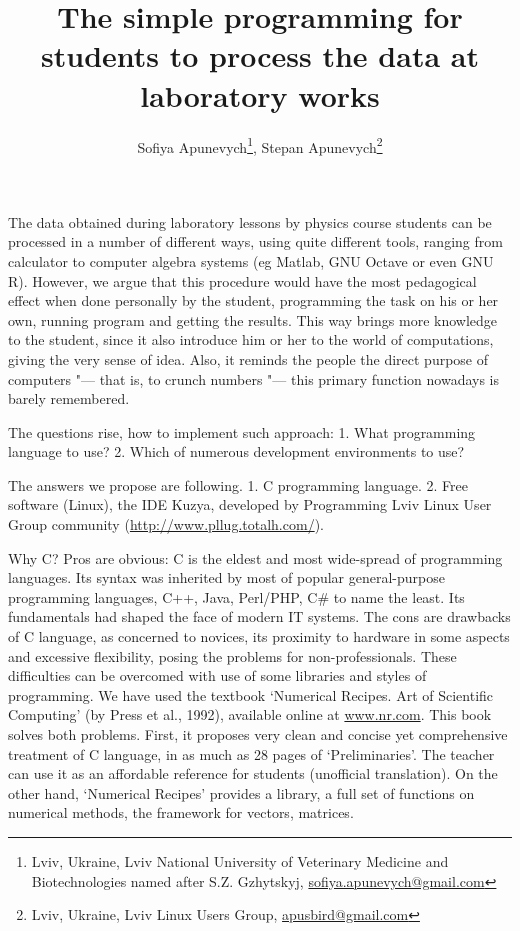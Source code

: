 \documentclass[10pt, a5paper]{article}
\begin{document}
\title{The simple programming for students to process the data at laboratory works}
\author{Sofiya Apunevych\footnote{Lviv, Ukraine, Lviv National University of Veterinary Medicine and Biotechnologies named after S.Z. Gzhytskyj, \url{sofiya.apunevych@gmail.com}}, Stepan Apunevych\footnote{Lviv, Ukraine, Lviv Linux Users Group, \url{apusbird@gmail.com}}}
\date{}
\maketitle

The data obtained during laboratory lessons by physics course students can be processed in a number of different ways, using quite different tools, ranging from calculator to computer algebra systems (eg Matlab, GNU Octave or even GNU R). However, we argue that this procedure would have the most pedagogical effect when done \linebreak personally by the student, programming the task on his or her own, running program and getting the results. This way brings more knowledge to the student, since it also introduce him or her to the world of computations, giving the very sense of idea. Also, it reminds the people the direct purpose of computers "--- that is, to crunch numbers "--- this primary function nowadays is barely remembered.

The questions rise, how to implement such approach: 1. What \linebreak programming language to use? 2. Which of numerous development environments to use?

The answers we propose are following. 1. C programming language. 2. Free software (Linux), the IDE Kuzya, developed by Programming Lviv Linux User Group community (\url{http://www.pllug.totalh.com/}). 

Why C? Pros are obvious: C is the eldest and most wide-spread of programming languages. Its syntax was inherited by most of popular general-purpose programming languages, C++, Java, Perl/PHP, C\#  to name the least. Its fundamentals had shaped the face of modern IT systems. The cons are drawbacks of C language, as concerned to novices, its proximity to hardware in some aspects and excessive \linebreak  flexibility, posing the problems for non-professionals. These difficulties can be overcomed with use of some libraries and styles of programming. We have used the textbook `Numerical Recipes. Art of Scientific Computing' (by Press et al., 1992), available online at \url{www.nr.com}. This book solves both problems. First, it proposes very clean and  concise yet comprehensive treatment of C language, in as much as 28 pages of `Preliminaries'. The teacher can use it as an affordable reference for students (unofficial translation). On the other hand, `Numerical Recipes' provides a library, a full set of functions on numerical methods, the framework for vectors, matrices.
\end{document}
